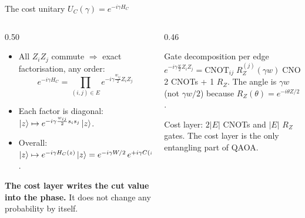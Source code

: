 \documentclass[aspectratio=169,11pt]{beamer}
\newcommand{\hl}[1]{{\color{qorange}\textbf{#1}}}
\begin{document}
\begin{frame}{The cost unitary $U_C(\gamma) = e^{-i\gamma H_C}$}
  \begin{columns}[T]
    \begin{column}{0.50\textwidth}
      \begin{itemize}
        \item All $Z_iZ_j$ commute $\Rightarrow$ exact factorisation, any order:
          \[ e^{-i\gamma H_C} = \prod_{(i,j)\in E} e^{-i\gamma\frac{w_{ij}}{2}Z_iZ_j} \]
        \item Each factor is diagonal: $\ket z \mapsto e^{-i\gamma\frac{w_{ij}}{2}s_is_j}\ket z$.
        \item Overall: $\ket z \mapsto e^{-i\gamma H_C(z)}\ket z = e^{-i\gamma W/2}\,e^{+i\gamma C(z)}\ket z$.
      \end{itemize}
      \hl{The cost layer writes the cut value into the phase.} It does not change any probability by itself.
    \end{column}
    \begin{column}{0.46\textwidth}
      \begin{block}{Gate decomposition per edge}
        \[ e^{-i\gamma\frac w2Z_iZ_j} = \mathrm{CNOT}_{ij}\;R_Z^{(j)}(\gamma w)\;\mathrm{CNOT}_{ij} \]
        2 CNOTs + 1 $R_Z$. The angle is $\gamma w$ (not $\gamma w/2$) because $R_Z(\theta) = e^{-i\theta Z/2}$.
      \end{block}
      \small Cost layer: $2|E|$ CNOTs and $|E|$ $R_Z$ gates. The cost layer is the only entangling part of QAOA.
    \end{column}
  \end{columns}
\end{frame}
\end{document}
